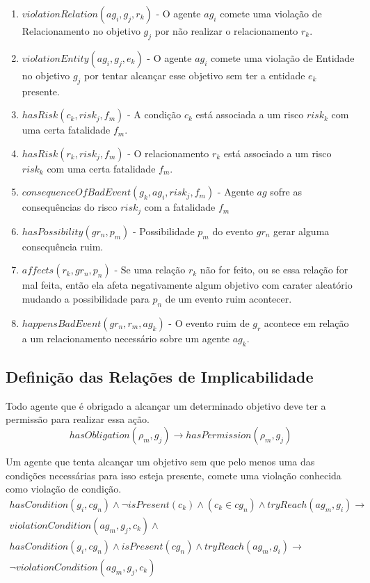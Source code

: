 \documentclass[12pt]{article}
\begin{document}
\begin{enumerate}
	\item $violationRelation(ag_i,g_j,r_k)$ - O agente $ag_i$ comete uma violação de Relacionamento no objetivo $g_j$ por não realizar o relacionamento $r_k$. 
	\item $violationEntity(ag_i,g_j,e_k)$ - O agente $ag_i$ comete uma violação de Entidade no objetivo $g_j$ por tentar alcançar esse objetivo sem ter a entidade $e_k$ presente.  	
	\item $hasRisk(c_k,risk_j,f_m)$ - A condição $c_k$ está associada a um risco $risk_k$ com uma certa fatalidade $f_m$. 
	\item $hasRisk(r_k,risk_j,f_m)$ - O relacionamento $r_k$ está associado a um risco $risk_k$ com uma certa fatalidade $f_m$.
	\item $consequenceOfBadEvent(g_k,ag_i,risk_j,f_m)$ - Agente $ag$ sofre as consequências do risco $risk_j$ com a fatalidade $f_m$
	\item $hasPossibility(gr_n,p_m)$ - Possibilidade $p_m$ do evento $gr_n$ gerar alguma consequência ruim. 	
	\item $affects(r_k,gr_n,p_n)$ - Se uma relação $r_k$ não for feito, ou se essa relação for mal feita, então ela afeta negativamente algum objetivo com carater aleatório mudando a possibilidade para $p_n$ de um evento ruim acontecer. 	
	\item $happensBadEvent(gr_n,r_m,ag_k)$ - O evento ruim de $g_r$ acontece em relação a um relacionamento necessário sobre um agente $ag_k$. 		
\end{enumerate}

\subsection{Definição das Relações de Implicabilidade}

Todo agente que é obrigado a alcançar um determinado objetivo deve ter a permissão para realizar essa ação.
\begin{equation}\label{rel1}
	hasObligation(\rho_m,g_j) \to hasPermission(\rho_m,g_j)  
\end{equation}

Um agente que tenta alcançar um objetivo sem que pelo menos uma das condições necessárias para isso esteja presente, comete uma violação conhecida como violação de condição.
\begin{eqnarray}\label{rel3}\nonumber
	hasCondition(g_i,cg_n) \wedge \neg isPresent(c_k) \wedge (c_k \in cg_n) \wedge tryReach(ag_m,g_i) \to \nonumber \\  
	violationCondition(ag_m,g_j,c_k) \wedge \nonumber \\
	hasCondition(g_i,cg_n) \wedge isPresent(cg_n) \wedge tryReach(ag_m,g_i) \to \nonumber \\  
	\neg violationCondition(ag_m,g_j,c_k)  	
\end{eqnarray}
\end{document}
